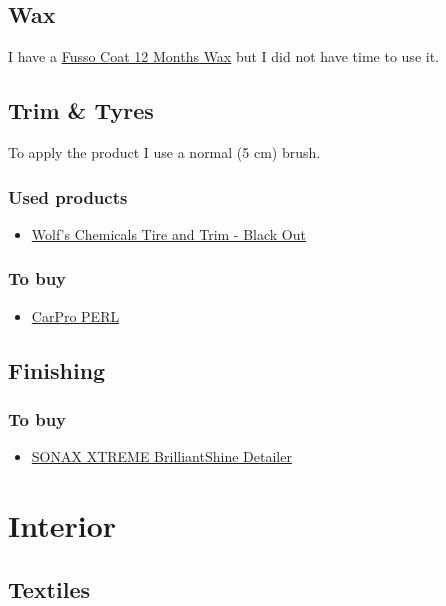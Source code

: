 \documentclass[12pt, a4paper, portrait]{article}
\begin{document}
\subsection{Wax}
I have a \href{http://www.soft99.co.jp/english/products/carcare/wax/fusso_coat_12.html}{Fusso Coat 12 Months Wax} but I did not have time to use it.

\subsection{Trim \& Tyres}
To apply the product I use a normal (5 cm) brush.
\subsubsection{Used products}
\begin{itemize}
\item{\href{http://wolfschemicals.com/shop/shop/dressing2/Tire_and_Trim_Gel}{Wolf's Chemicals Tire and Trim - Black Out}}
\end{itemize}
\subsubsection{To buy}
\begin{itemize}
\item{\href{https://carpro.uk.com/products/perl-plastic-engine-rubber-leather-500ml}{CarPro PERL}}
\end{itemize}

\subsection{Finishing}
\subsubsection{To buy}
\begin{itemize}
\item{\href{https://www.sonax.com/Product-Search/(location)/19404-SONAX-XTREME-BrilliantShine-Detailer}{SONAX XTREME BrilliantShine Detailer}}
\end{itemize}

\pagebreak
\section{Interior}
\subsection{Textiles}
\end{document}

